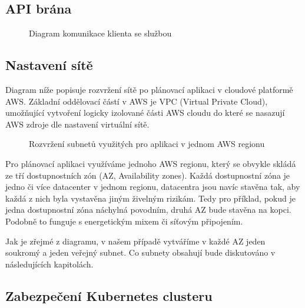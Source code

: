 \documentclass[thesis=M,czech]{FITthesis}[2019/12/23]
\theoremstyle{plain}
\theoremstyle{definition}
\begin{document}



\subsection{API brána}


\begin{figure}[H]\centering
	

	\caption[Diagram komunikace klienta se službou]{Diagram komunikace klienta se službou}\label{fig:float}
\end{figure}



\subsection{Nastavení sítě}

Diagram níže popisuje rozvržení sítě po plánovací aplikaci v cloudové platformě AWS. Základní oddělovací částí v AWS je VPC (Virtual Private Cloud)\cite{aws-vpc}, umožňující vytvoření logicky izolované části AWS cloudu do které se nasazují AWS zdroje dle nastavení virtuální sítě.

\begin{figure}[H]\centering
	

	\caption[Rozvržení subnetů využitých pro aplikaci v jednom AWS regionu]{Rozvržení subnetů využitých pro aplikaci v jednom AWS regionu}\label{fig:float}
\end{figure}

Pro plánovací aplikaci využíváme jednoho AWS regionu, který se obvykle skládá ze tří dostupnostních zón (AZ, Availability zones)\cite{aws-azs}. Každá dostupnostní zóna je jedno či více datacenter v jednom regionu, datacentra jsou navíc stavěna tak, aby každá z nich byla vystavěna jiným živelným rizikám. Tedy pro příklad, pokud je jedna dostupnostní zóna náchylná povodním, druhá AZ bude stavěna na kopci. Podobně to funguje s energetickým mixem či síťovým připojením. 


Jak je zřejmé z diagramu, v našem případě vytváříme v každé AZ jeden soukromý a jeden veřejný subnet. Co subnety obsahují bude diskutováno v následujících kapitolách.

\subsection{Zabezpečení Kubernetes clusteru}
\end{document}
